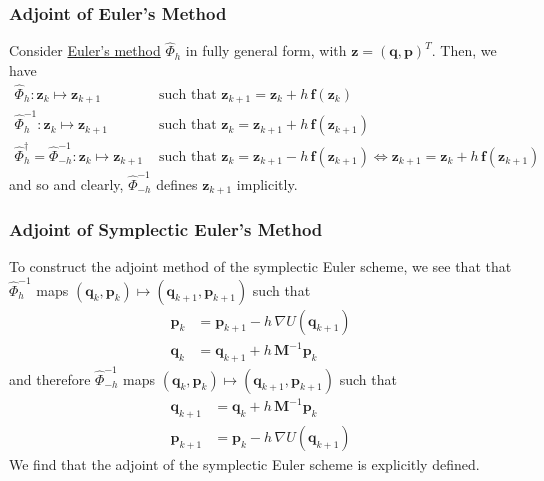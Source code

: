     \subsubsection{Adjoint of Euler's Method}

      Consider \hyperref[ode-thm:eulers-method]{Euler's method} $\hat{\Phi}_{h}$ in fully general form, with $\mathbf{z} = (\mathbf{q}, \mathbf{p})^T$. Then, we have 
      \begin{align*}
        \hat{\Phi}_{h}: \mathbf{z}_k \mapsto \mathbf{z}_{k+1} & \text{ such that } \mathbf{z}_{k + 1} = \mathbf{z}_k + h \,\mathbf{f}( \mathbf{z}_k) \\
        \hat{\Phi}_{h}^{-1}: \mathbf{z}_k \mapsto \mathbf{z}_{k+1} & \text{ such that } \mathbf{z}_{k} = \mathbf{z}_{k+1} + h \,\mathbf{f}( \mathbf{z}_{k+1}) \\
        \hat{\Phi}_h^\dagger = \hat{\Phi}_{-h}^{-1}: \mathbf{z}_k \mapsto \mathbf{z}_{k+1} & \text{ such that } \mathbf{z}_{k} = \mathbf{z}_{k+1} - h \,\mathbf{f}( \mathbf{z}_{k+1}) \iff \mathbf{z}_{k+1} = \mathbf{z}_k + h\, \mathbf{f}(\mathbf{z}_{k+1}) 
      \end{align*}
      and so 
      and clearly, $\hat{\Phi}_{-h}^{-1}$ defines $\mathbf{z}_{k+1}$ implicitly. 

    \subsubsection{Adjoint of Symplectic Euler's Method}

      To construct the adjoint method of the symplectic Euler scheme, we see that that $\hat{\Phi}_{h}^{-1}$ maps $(\mathbf{q}_k, \mathbf{p}_k) \mapsto (\mathbf{q}_{k+1}, \mathbf{p}_{k+1})$ such that
      \begin{align*}
        \mathbf{p}_k & = \mathbf{p}_{k+1} - h \, \nabla U(\mathbf{q}_{k+1}) \\
        \mathbf{q}_k & = \mathbf{q}_{k+1} + h \, \mathbf{M}^{-1} \mathbf{p}_{k} 
      \end{align*}
      and therefore $\hat{\Phi}_{- h}^{-1}$ maps $(\mathbf{q}_k, \mathbf{p}_k) \mapsto (\mathbf{q}_{k+1}, \mathbf{p}_{k+1})$ such that
      \begin{align*}
        \mathbf{q}_{k+1} & = \mathbf{q}_k + h \, \mathbf{M}^{-1} \mathbf{p}_k \\
        \mathbf{p}_{k+1} & = \mathbf{p}_k - h \, \nabla U (\mathbf{q}_{k+1})
      \end{align*}
      We find that the adjoint of the symplectic Euler scheme is explicitly defined. 

